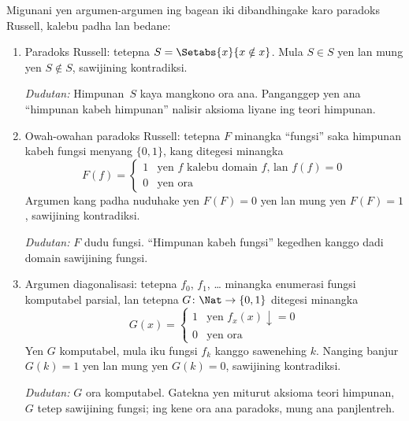 \documentclass[../../../include/open-logic-section]{subfiles}
\begin{document}

Migunani yen argumen-argumen ing bagean iki
dibandhingake karo paradoks Russell, kalebu
padha lan bedane:
\begin{enumerate}
\item Paradoks Russell: tetepna $S = \Setabs{x}{x \notin x}$.
  Mula $S \in S$ yen lan mung yen $S \notin S$,
  sawijining kontradiksi.

  \emph{Dudutan:} Himpunan~$S$ kaya mangkono ora ana.
  Panganggep yen ana ``himpunan kabeh himpunan''
  nalisir aksioma liyane ing teori himpunan.

\item Owah-owahan paradoks Russell: tetepna $F$ minangka
  ``fungsi'' saka himpunan kabeh fungsi menyang
  $\{ 0, 1 \}$, kang ditegesi minangka
  \[
  F(f) =
  \begin{cases}
    1 & \text{yen $f$ kalebu domain $f$, lan $f(f) = 0$} \\
    0 & \text{yen ora}
  \end{cases}
  \]
  Argumen kang padha nuduhake yen $F(F) = 0$
  yen lan mung yen $F(F) = 1$, sawijining kontradiksi.

  \emph{Dudutan:} $F$ dudu fungsi. ``Himpunan kabeh
  fungsi'' kegedhen kanggo dadi domain sawijining fungsi.

\item Argumen diagonalisasi: tetepna $f_0$, $f_1$, \dots
  minangka enumerasi fungsi komputabel parsial,
  lan tetepna $G \colon \Nat \to
  \{ 0, 1 \}$ ditegesi minangka
  \[
  G(x) =
  \begin{cases}
    1 & \text{yen $f_x(x)\downarrow = 0$} \\
    0 & \text{yen ora}
  \end{cases}
  \]
  Yen $G$ komputabel, mula iku fungsi $f_k$
  kanggo sawenehing $k$. Nanging banjur $G(k) = 1$
  yen lan mung yen $G(k) = 0$, sawijining kontradiksi.

  \emph{Dudutan:} $G$ ora komputabel. Gatekna yen miturut
  aksioma teori himpunan, $G$ tetep sawijining fungsi;
  ing kene ora ana paradoks, mung ana panjlentreh.
\end{enumerate}
\end{document}
